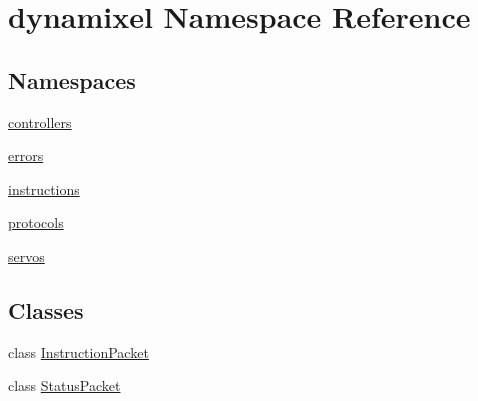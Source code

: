 \hypertarget{namespacedynamixel}{}\section{dynamixel Namespace Reference}
\label{namespacedynamixel}
\subsection*{Namespaces}
\begin{DoxyCompactItemize}
\item 
 \hyperlink{namespacedynamixel_1_1controllers}{controllers}
\item 
 \hyperlink{namespacedynamixel_1_1errors}{errors}
\item 
 \hyperlink{namespacedynamixel_1_1instructions}{instructions}
\item 
 \hyperlink{namespacedynamixel_1_1protocols}{protocols}
\item 
 \hyperlink{namespacedynamixel_1_1servos}{servos}
\end{DoxyCompactItemize}
\subsection*{Classes}
\begin{DoxyCompactItemize}
\item 
class \hyperlink{classdynamixel_1_1_instruction_packet}{Instruction\+Packet}
\item 
class \hyperlink{classdynamixel_1_1_status_packet}{Status\+Packet}
\end{DoxyCompactItemize}
